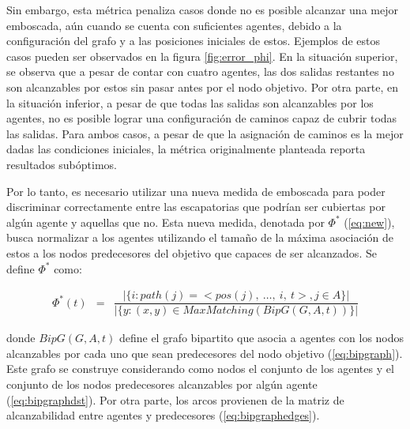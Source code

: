 

Sin embargo, esta m\'etrica penaliza casos donde no es posible alcanzar
una mejor emboscada, a\'un cuando se cuenta con suficientes agentes, debido
a la configuraci\'on del grafo y a las posiciones iniciales de estos. 
Ejemplos de estos casos pueden ser observados en la figura \ref{fig:error_phi}. En
la situaci\'on superior, se observa que a pesar de contar con cuatro agentes,
las dos salidas restantes no son alcanzables por estos sin pasar antes por el
nodo objetivo. Por otra parte, en la situaci\'on inferior, a pesar de que todas
las salidas son alcanzables por los agentes, no es posible lograr una
configuraci\'on de caminos capaz de cubrir todas las salidas. Para ambos
casos, a pesar de que la asignaci\'on de caminos es la mejor dadas las
condiciones iniciales, la m\'etrica originalmente planteada reporta resultados
sub\'optimos.



Por lo tanto, es necesario utilizar una nueva medida de emboscada
para poder discriminar correctamente entre las escapatorias que podr\'ian
ser cubiertas por alg\'un agente y aquellas que no. Esta nueva medida,
denotada por $\Phi^*$ (\ref{eq:new}), busca normalizar a los agentes utilizando
el tamaño de la m\'axima asociaci\'on de estos a los nodos predecesores
del objetivo que capaces de ser alcanzados. Se define $\Phi^*$ como:

\begin{small}
\begin{eqnarray}
 \Phi^*(t) &=& 
\dfrac{|\{ i : path(j) = <pos(j),\ \ldots,\ i,\ t>, j \in A\}|}
	  {|\{ y : (x,y) \in MaxMatching(BipG(G,A,t))\}|}
\label{eq:new}
\end{eqnarray}
\end{small}

\noindent
donde $BipG(G,A,t)$ define el grafo bipartito que asocia a agentes con
los nodos alcanzables por cada uno que sean predecesores del nodo objetivo
(\ref{eq:bipgraph}).
Este grafo se construye considerando como nodos el conjunto
de los agentes y el conjunto de los nodos predecesores alcanzables por alg\'un
agente (\ref{eq:bipgraphdst}). Por otra parte, los arcos provienen
de la matriz de alcanzabilidad entre agentes y predecesores (\ref{eq:bipgraphedges}).


